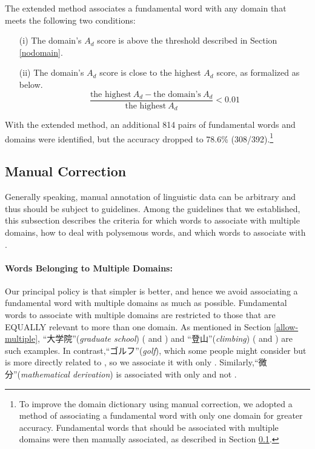 \documentclass[english]{jnlp_1.4_rep}
\newcommand{\dom}[1]{}
\begin{document}
The extended method associates a fundamental word with any domain that
meets the following two conditions:
\begin{itemize}
 \item[(i)] The domain's $A_d$ score is above the threshold described
in Section \ref{nodomain}.
 \item[(ii)] The domain's $A_d$ score is close to the highest $A_d$
score, as formalized as below.
\[
 \frac{\text{the highest}~A_d - \text{the domain's}~A_d}{\text{the highest}~A_d} < 0.01
\]
\end{itemize}

With the extended method, an additional 814 pairs of fundamental words
and domains were identified,
but the accuracy dropped to 78.6\% (308/392).\footnote{
To improve the domain dictionary using manual correction,
we adopted a method of associating a fundamental word with only one
domain for greater accuracy.
Fundamental words that should be associated with multiple domains were
then manually associated,
as described in Section \ref{manual-correction}.}


\subsection{Manual Correction}
\label{manual-correction}

Generally speaking, manual annotation of linguistic data can be
arbitrary and thus should be subject to guidelines.
Among the guidelines that we established, this subsection describes
the criteria for which words to associate with multiple domains,
how to deal with polysemous words, 
and which words to associate with \dom{nodomain}.

\paragraph{Words Belonging to Multiple Domains: }
Our principal policy is that 
simpler is better, and hence we avoid associating a fundamental word with
multiple domains
as much as possible.
Fundamental words to associate with multiple domains are restricted to those that
are EQUALLY relevant to more than one domain.
As mentioned in Section \ref{allow-multiple}, 
“大学院”(\textit{graduate school}) (\dom{education} and \dom{science}) and
“登山”(\textit{climbing}) (\dom{recreation} and \dom{sports}) are such
examples. 
In contrast,“ゴルフ”(\textit{golf}), which some people might consider
\dom{recreation} but is more directly related to
\dom{sports}, so we associate it with only \dom{sports}.
Similarly,“微分”(\textit{mathematical derivation}) is associated with
only \dom{education} and not \dom{science}.
\end{document}
